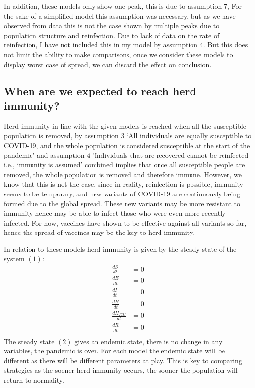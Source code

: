 \documentclass[11pt]{article}
\begin{document}
In addition, these models only show one peak, this is due to assumption $7$, For the sake of a simplified model this assumption was necessary, but as we have observed from data this is not the case shown by multiple peaks due to population structure and reinfection. Due to lack of data on the rate of reinfection, I have not included this in my model by assumption $4$. But this does not limit the ability to make comparisons, once we consider these models to display worst case of spread, we can discard the effect on conclusion. \par
\subsection{When are we expected to reach herd immunity?}Herd immunity in line with the given models is reached when all the susceptible population is removed, by assumption $3$ ‘All individuals are equally susceptible to COVID-19, and the whole population is considered susceptible at the start of the pandemic’ and assumption $4$ ‘Individuals that are recovered cannot be reinfected i.e., immunity is assumed’ combined implies that once all susceptible people are removed, the whole population is removed and therefore immune. However, we know that this is not the case, since in reality, reinfection is possible, immunity seems to be temporary, and new variants of COVID-19 are continuously being formed due to the global spread. These new variants may be more resistant to immunity hence may be able to infect those who were even more recently infected. For now, vaccines have shown to be effective against all variants so far, hence the spread of vaccines may be the key to herd immunity. \par
In relation to these models herd immunity is given by the steady state of the system $(1)$:
\begin{equation}
\begin{aligned}
\frac{dS}{dt}&=0\\
\frac{dE}{dt}&= 0 \\
\frac{dI}{dt}&= 0 \\
\frac{dH}{dt}&= 0\\
\frac{dH_{ICU}}{dt}&= 0 \\
\frac{dR}{dt}&=0 \\
\end{aligned}
\end{equation}
The steady state $(2)$ gives an endemic state, there is no change in any variables, the pandemic is over. For each model the endemic state will be different as there will be different parameters at play. This is key to comparing strategies as the sooner herd immunity occurs, the sooner the population will return to normality.
\end{document}
